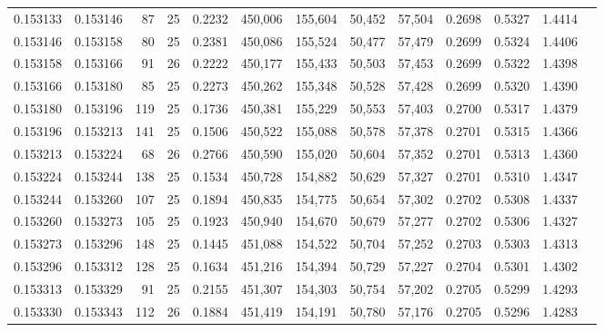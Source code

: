 \begin{tabular}{rrrrrrrrrrrrr}
0.153133 & 0.153146 &    87 &  25 &                                     0.2232 & 450,006 & 155,604 &  50,452 &  57,504 & 0.2698 & 0.5327 & 1.4414 \\
0.153146 & 0.153158 &    80 &  25 &                                     0.2381 & 450,086 & 155,524 &  50,477 &  57,479 & 0.2699 & 0.5324 & 1.4406 \\
0.153158 & 0.153166 &    91 &  26 &                                     0.2222 & 450,177 & 155,433 &  50,503 &  57,453 & 0.2699 & 0.5322 & 1.4398 \\
0.153166 & 0.153180 &    85 &  25 &                                     0.2273 & 450,262 & 155,348 &  50,528 &  57,428 & 0.2699 & 0.5320 & 1.4390 \\
0.153180 & 0.153196 &   119 &  25 &                                     0.1736 & 450,381 & 155,229 &  50,553 &  57,403 & 0.2700 & 0.5317 & 1.4379 \\
0.153196 & 0.153213 &   141 &  25 &                                     0.1506 & 450,522 & 155,088 &  50,578 &  57,378 & 0.2701 & 0.5315 & 1.4366 \\
0.153213 & 0.153224 &    68 &  26 &                                     0.2766 & 450,590 & 155,020 &  50,604 &  57,352 & 0.2701 & 0.5313 & 1.4360 \\
0.153224 & 0.153244 &   138 &  25 &                                     0.1534 & 450,728 & 154,882 &  50,629 &  57,327 & 0.2701 & 0.5310 & 1.4347 \\
0.153244 & 0.153260 &   107 &  25 &                                     0.1894 & 450,835 & 154,775 &  50,654 &  57,302 & 0.2702 & 0.5308 & 1.4337 \\
0.153260 & 0.153273 &   105 &  25 &                                     0.1923 & 450,940 & 154,670 &  50,679 &  57,277 & 0.2702 & 0.5306 & 1.4327 \\
0.153273 & 0.153296 &   148 &  25 &                                     0.1445 & 451,088 & 154,522 &  50,704 &  57,252 & 0.2703 & 0.5303 & 1.4313 \\
0.153296 & 0.153312 &   128 &  25 &                                     0.1634 & 451,216 & 154,394 &  50,729 &  57,227 & 0.2704 & 0.5301 & 1.4302 \\
0.153313 & 0.153329 &    91 &  25 &                                     0.2155 & 451,307 & 154,303 &  50,754 &  57,202 & 0.2705 & 0.5299 & 1.4293 \\
0.153330 & 0.153343 &   112 &  26 &                                     0.1884 & 451,419 & 154,191 &  50,780 &  57,176 & 0.2705 & 0.5296 & 1.4283 \\

\end{tabular}
